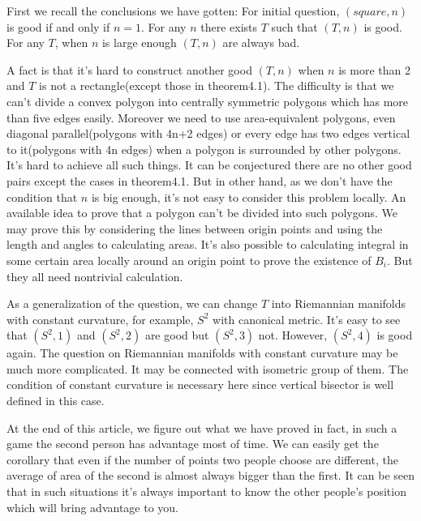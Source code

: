 First we recall the conclusions we have gotten: For initial question,
$(square, n)$ is good if and only if $n=1$. For any $n$ there exists 
$T$ such that $(T,n)$ is good. For any $T$, when $n$ is large enough 
$(T,n)$ are always bad.
 	
	
A fact is that it's hard to construct another good $(T, n)$ when $n$ 
is more than 2 and $T$ is not a rectangle(except those in 
theorem4.1). The difficulty is that we can't divide a convex polygon 
into centrally symmetric polygons which has more than five edges easily. 
Moreover we need to use area-equivalent polygons, even 
diagonal parallel(polygons with 4n+2 edges) or every edge has two edges
vertical to it(polygons with 4n edges) when a polygon is surrounded by 
other polygons. It's hard to achieve all such things. It can be conjectured 
there are no other good pairs except the cases in theorem4.1. 
But in other hand, as we don't have the condition that $n$ is big enough, 
it's not easy to consider this problem locally. An available  idea 
to prove that a polygon can't be divided into such polygons. We may prove
this by considering the lines between origin points and using the length 
and angles to calculating areas. It's also possible to calculating 
integral in some certain area locally around an origin point to prove 
the existence of $B_i$. But they all need nontrivial calculation.
	
As a generalization of the question, we can change $T$ into Riemannian 
manifolds with constant curvature, for example, $S^2$ with canonical metric.
It's easy to see that $(S^2, 1)$ and $(S^2, 2)$ are good but $(S^2, 3)$ not.
However, $(S^2,4)$ is good again. The question on Riemannian manifolds 
with constant curvature may be much more complicated. It may be connected 
with isometric group of them.
The condition of constant curvature is necessary here since vertical bisector
is well defined in this case.
	
At the end of this article, we figure out what we have proved in fact, 
in such a game the second person  has advantage most of time. We can 
easily get the corollary that even if the number of points two people 
choose are different, the average of area of the second is almost always 
bigger than the first. It can be seen that in such situations it's always 
important to know the other people's position which will bring advantage 
to you.